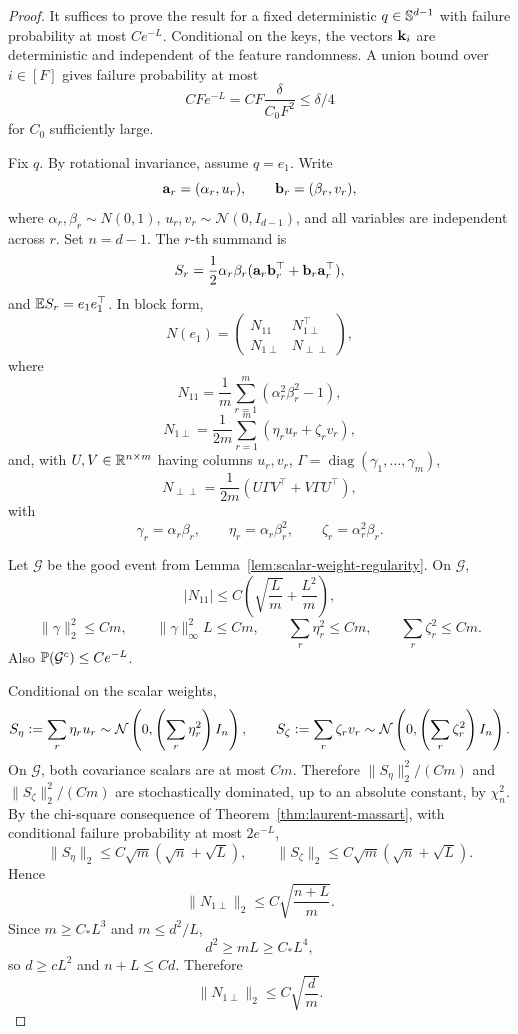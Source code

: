 \begin{proof}
It suffices to prove the result for a fixed deterministic \(q\in\mathbb{S}^{d-1}\) with
failure probability at most \(Ce^{-L}\). Conditional on the keys, the vectors
\({\mathbf{k}}_i\) are deterministic and independent of the feature randomness. A union
bound over \(i\in[F]\) gives failure probability at most
\[
CFe^{-L}=CF\frac{\delta}{C_0F^2}\le \delta/4
\]
for \(C_0\) sufficiently large.

Fix \(q\). By rotational invariance, assume \(q=e_1\). Write
\[
{\mathbf{a}}_r=(\alpha_r,u_r),
\qquad
{\mathbf{b}}_r=(\beta_r,v_r),
\]
where \(\alpha_r,\beta_r\sim N(0,1)\), \(u_r,v_r\sim\mathcal N(0,I_{d-1})\), and
all variables are independent across \(r\). Set \(n=d-1\). The \(r\)-th summand is
\[
S_r
=
\frac12\alpha_r\beta_r({\mathbf{a}}_r{\mathbf{b}}_r^\top+{\mathbf{b}}_r{\mathbf{a}}_r^\top),
\]
and \(\mathbb{E} S_r=e_1e_1^\top\). In block form,
\[
N(e_1)
=
\begin{pmatrix}
N_{11} & N_{1\perp}^\top\\
N_{1\perp} & N_{\perp\perp}
\end{pmatrix},
\]
where
\[
N_{11}=\frac1m\sum_{r=1}^m(\alpha_r^2\beta_r^2-1),
\]
\[
N_{1\perp}=\frac1{2m}\sum_{r=1}^m(\eta_ru_r+\zeta_rv_r),
\]
and, with \(U,V\in\mathbb{R}^{n\times m}\) having columns \(u_r,v_r\),
\(\Gamma=\operatorname{diag}(\gamma_1,\dots,\gamma_m)\),
\[
N_{\perp\perp}
=
\frac1{2m}(U\Gamma V^\top+V\Gamma U^\top),
\]
with
\[
\gamma_r=\alpha_r\beta_r,
\qquad
\eta_r=\alpha_r\beta_r^2,
\qquad
\zeta_r=\alpha_r^2\beta_r.
\]

Let \(\mathcal G\) be the good event from Lemma~\ref{lem:scalar-weight-regularity}.
On \(\mathcal G\),
\[
|N_{11}|\le C\left(\sqrt{\frac Lm}+\frac{L^2}{m}\right),
\]
\[
\|\gamma\|_2^2\le Cm,
\qquad
\|\gamma\|_\infty^2L\le Cm,
\qquad
\sum_r\eta_r^2\le Cm,
\qquad
\sum_r\zeta_r^2\le Cm.
\]
Also \(\mathbb{P}(\mathcal G^c)\le Ce^{-L}\).

Conditional on the scalar weights,
\[
S_\eta\vcentcolon=\sum_r\eta_ru_r
\sim
\mathcal N\left(0,\left(\sum_r\eta_r^2\right)I_n\right),
\qquad
S_\zeta\vcentcolon=\sum_r\zeta_rv_r
\sim
\mathcal N\left(0,\left(\sum_r\zeta_r^2\right)I_n\right).
\]
On \(\mathcal G\), both covariance scalars are at most \(Cm\). Therefore
\(\|S_\eta\|_2^2/(Cm)\) and \(\|S_\zeta\|_2^2/(Cm)\) are stochastically dominated,
up to an absolute constant, by \(\chi_n^2\). By the chi-square consequence of
Theorem~\ref{thm:laurent-massart}, with conditional failure probability at most
\(2e^{-L}\),
\[
\|S_\eta\|_2
\le
C\sqrt m(\sqrt n+\sqrt L),
\qquad
\|S_\zeta\|_2
\le
C\sqrt m(\sqrt n+\sqrt L).
\]
Hence
\[
\|N_{1\perp}\|_2
\le
C\sqrt{\frac{n+L}{m}}.
\]
Since \(m\ge C_*L^3\) and \(m\le d^2/L\),
\[
d^2\ge mL\ge C_*L^4,
\]
so \(d\ge cL^2\) and \(n+L\le Cd\). Therefore
\[
\|N_{1\perp}\|_2\le C\sqrt{\frac dm}.
\]


\end{proof}
